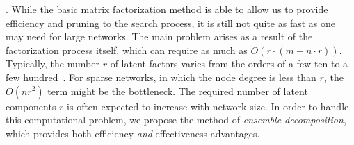 . While the basic matrix factorization method is able to allow us to provide
efficiency and pruning to the search process, it is still not quite
as fast as one may need for large networks. The main problem
arises as a result of the factorization process itself, which can
require as much as $O(r \cdot (m + n\cdot r))$.  Typically, the
number $r$ of latent factors varies from the orders of a few ten to a few hundred~\cite{NMF-nature99, NMF-www2010}. For
sparse networks, in which the node degree is less than $r$, the $O(n
r^2)$ term might be the bottleneck.  The required  number of latent
components $r$ is often expected to increase with network size. In
order to handle this computational problem, we propose the method of
{\em ensemble decomposition}, which provides both efficiency {\em
and} effectiveness advantages.
